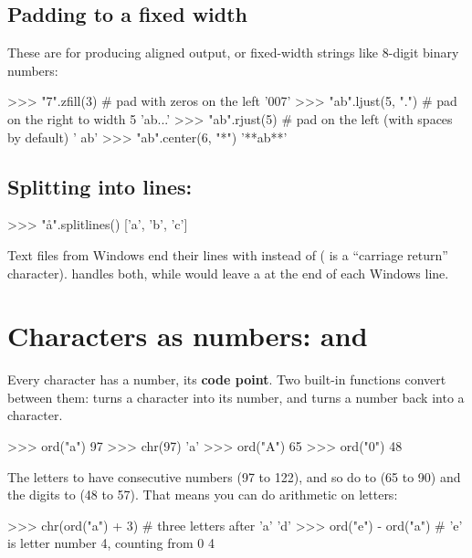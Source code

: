 \documentclass[10pt,a4paper]{article}
\begin{document}
\subsection{Padding to a fixed width}
These are for producing aligned output, or fixed-width strings like 8-digit binary numbers:
\begin{txtcode}
>>> "7".zfill(3)          # pad with zeros on the left
'007'
>>> "ab".ljust(5, ".")    # pad on the right to width 5
'ab...'
>>> "ab".rjust(5)         # pad on the left (with spaces by default)
'   ab'
>>> "ab".center(6, "*")
'**ab**'
\end{txtcode}
\subsection{Splitting into lines: }
\begin{txtcode}
>>> "a\nb\r\nc".splitlines()
['a', 'b', 'c']
\end{txtcode}
Text files from Windows end their lines with  instead of  ( is a “carriage return” character).  handles both, while  would leave a  at the end of each Windows line.
\setcounter{section}{2}
\section{Characters as numbers:  and }
Every character has a number, its \textbf{code point}. Two built-in functions convert between them:  turns a character into its number, and  turns a number back into a character.
\begin{txtcode}
>>> ord("a")
97
>>> chr(97)
'a'
>>> ord("A")
65
>>> ord("0")
48
\end{txtcode}
The letters  to  have consecutive numbers (97 to 122), and so do  to  (65 to 90) and the digits  to  (48 to 57). That means you can do arithmetic on letters:
\begin{txtcode}
>>> chr(ord("a") + 3)      # three letters after 'a'
'd'
>>> ord("e") - ord("a")    # 'e' is letter number 4, counting from 0
4
\end{txtcode}
\end{document}
